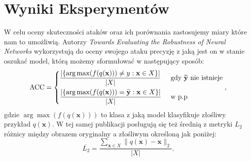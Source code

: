 \documentclass[
    left=2.5cm,         %
    right=2.5cm,        %
    top=2.5cm,          %
    bottom=3cm,         %
    bindingoffset=6mm,  %
    nohyphenation=false %
]{eiti/eiti-thesis}
\renewcommand{\vec}[1]{\mathbf{#1}}
\begin{document}
\section{Wyniki Eksperymentów}\label{comparison}
    W celu oceny skuteczności ataków oraz ich porównania zastosujemy miary które nam to umożliwią.
    Autorzy \textit{Towards Evaluating the Robustness of Neural Networks}\cite{DBLP:journals/corr/CarliniW16a} wykorzystują do oceny swojego ataku precyzję z jaką jest on w stanie oszukać
    model, którą możemy sformułować w następujący sposób:
    \begin{equation}
        \text{ACC}=\begin{dcases}
           \frac{|\{ \arg \max (f(q(\vec{x}))) \neq y : \vec{x}\in X\}|}{|X|} & \text{ gdy \(\vec{\widetilde{y}}\) nie istnieje}\\
           \frac{|\{\arg \max (f(q(\vec{x}))) =\vec{\widetilde{y}} : \vec{x} \in X\}|}{|X|} & \text{ w p.p}
        \end{dcases},
    \end{equation}
    gdzie \(\arg \max (f(q(\vec{x})))\) to klasa z jaką model klasyfikuje złośliwy przykład \(q(\vec{x})\).
    W tej samej publikacji posługują się też średnią z metryki \(L_2\) różnicy między obrazem oryginalny a złośliwym określoną jak poniżej:
    \begin{equation}
        \overline{L_2}=\frac{\sum_{\vec{x} \in X}\|q(\vec{x})-\vec{x}\|_2}{|X|}.
    \end{equation}
\end{document}
